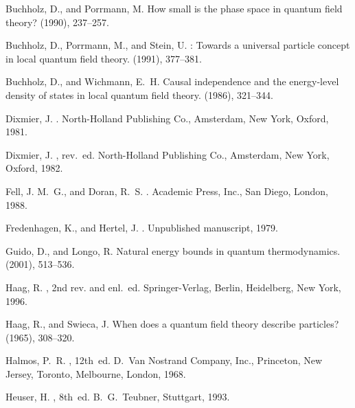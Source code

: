 \documentclass[a4paper,a4paper]{article}
\numberwithin{equation}{section}
\theoremstyle{definition}
\theoremstyle{plain}
\theoremstyle{remark}
\theoremstyle{assumption}
\begin{document}
\begin{thebibliography}{10}
{\sc Buchholz, D., and Porrmann, M.}
\newblock How small is the phase space in quantum field theory?
 (1990),
  237--257.

{\sc Buchholz, D., Porrmann, M., and Stein, U.}
: Towards a universal particle concept in local
  quantum field theory.
 (1991), 377--381.

{\sc Buchholz, D., and Wichmann, E.~H.}
\newblock Causal independence and the energy-level density of states in local
  quantum field theory.
 (1986), 321--344.

{\sc Dixmier, J.}
.
\newblock North-Holland Publishing Co., Amsterdam, New York, Oxford, 1981.

{\sc Dixmier, J.}
, rev.~ed.
\newblock North-Holland Publishing Co., Amsterdam, New York, Oxford, 1982.

{\sc Fell, J. M.~G., and Doran, R.~S.}
.
\newblock Academic Press, Inc., San Diego, London, 1988.

{\sc Fredenhagen, K., and Hertel, J.}
.
\newblock Unpublished manuscript, 1979.

{\sc Guido, D., and Longo, R.}
\newblock Natural energy bounds in quantum thermodynamics.
 (2001), 513--536.

{\sc Haag, R.}
, 2nd rev. and enl.~ed.
\newblock Springer-Verlag, Berlin, Heidelberg, New York, 1996.

{\sc Haag, R., and Swieca, J.}
\newblock When does a quantum field theory describe particles?
 (1965), 308--320.

{\sc Halmos, P.~R.}
, 12th~ed.
\newblock D.~Van Nostrand Company, Inc., Princeton, New Jersey, Toronto,
  Melbourne, London, 1968.

{\sc Heuser, H.}
, 8th~ed.
\newblock B.~G.~Teubner, Stuttgart, 1993.


\end{thebibliography}
\end{document}
